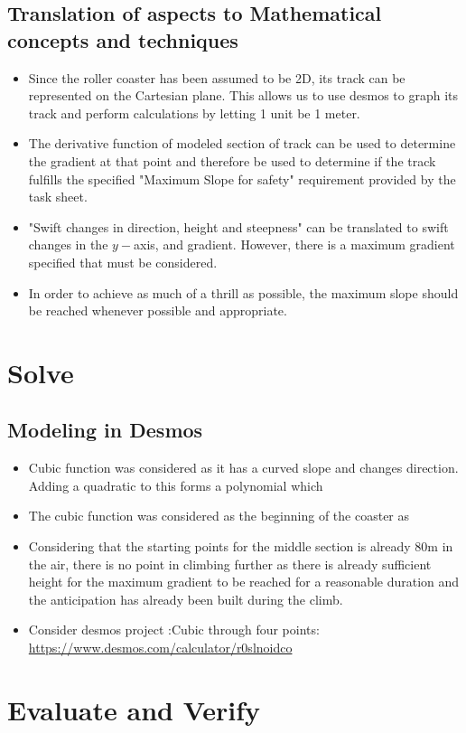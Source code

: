 \documentclass[11pt, letterpaper]{article}
\begin{document}
\subsection{Translation of aspects to Mathematical concepts and techniques}
\begin{itemize}
	\item Since the roller coaster has been assumed to be 2D, its track can be represented on the Cartesian plane. This allows us to use desmos to graph its track and perform calculations by letting 1 unit be 1 meter. 
	\item The derivative function of modeled section of track can be used to determine the gradient at that point and therefore be used to determine if the track fulfills the specified "Maximum Slope for safety" requirement provided by the task sheet.
	\item "Swift changes in direction, height and steepness" can be translated to swift changes in the $y-$axis, and gradient. However, there is a maximum gradient specified that must be considered. 
	\item In order to achieve as much of a thrill as possible, the maximum slope should be reached whenever possible and appropriate.


\end{itemize}


\section{Solve}
\subsection{Modeling in Desmos}
\begin{itemize}
	\item Cubic function was considered as it has a curved slope and changes direction. Adding a quadratic to this forms a polynomial which 
	\item The cubic function was considered as the beginning of the coaster as 
	\item Considering that the starting points for the middle section is already 80m in the air, there is no point in climbing further as there is already sufficient height for the maximum gradient to be reached for a reasonable duration and the anticipation has already been built during the climb. 
	\item Consider desmos project :Cubic through four points: \url{https://www.desmos.com/calculator/r0slnoidco}
	
\end{itemize}




\section{Evaluate and Verify}
\end{document}
